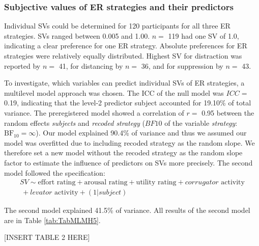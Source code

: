 \documentclass[
  man,floatsintext]{apa6}
\begin{document}
\hypertarget{subjective-values-of-er-strategies-and-their-predictors}{%
\subsubsection{Subjective values of ER strategies and their predictors}\label{subjective-values-of-er-strategies-and-their-predictors}}

Individual SVs could be determined for 120 participants for all three ER strategies.
SVs ranged between 0.005 and 1.00.
\(n=\) 119 had one SV of 1.0, indicating a clear preference for one ER strategy.
Absolute preferences for ER strategies were relatively equally distributed.
Highest SV for distraction was reported by \(n=\) 41, for distancing by \(n=\) 36, and for suppression by \(n=\) 43.

To investigate, which variables can predict individual SVs of ER strategies, a multilevel model approach was chosen.
The ICC of the null model was \(ICC=\) 0.19, indicating that the level-2 predictor subject accounted for 19.10\% of total variance.
The preregistered model showed a correlation of \(r=\) 0.95 between the random effects \emph{subjects} and \emph{recoded strategy} (\(BF10\) of the variable \emph{strategy}: \(\mathrm{BF}_{\textrm{10}} = \infty\)).
Our model explained 90.4\% of variance and thus we assumed our model was overfitted due to including recoded strategy as the random slope.
We therefore set a new model without the recoded strategy as the random slope factor to estimate the influence of predictors on SVs more precisely.
The second model followed the specification:
\[
\begin{split}
SV \sim \text{effort rating} + \text{arousal rating} + \text{utility rating} + corrugator \text{ activity} \\\ + levator \text{ activity} + (1 |subject)
\end{split}
\]

The second model explained 41.5\% of variance.
All results of the second model are in Table \ref{tab:TabMLMH5}.

{[}INSERT TABLE 2 HERE{]}
\end{document}
